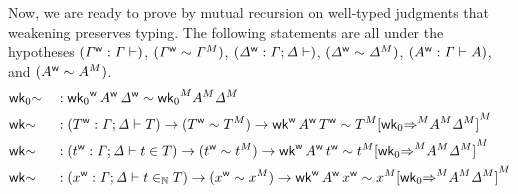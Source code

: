 Now, we are ready to prove by mutual recursion on well-typed judgments that
weakening preserves typing. The following statements are all under the
hypotheses
  $(\wf{\GG} : \GG \vdash)$,
  $(\wf\GG \sim \model{\GG})$,
  $(\wf{\GD} : \GG\merge\GD \vdash)$,
  $(\wf\GD \sim \model{\GD})$,
  $(\wf{A} : \GG \vdash A)$,
  and
  $(\wf{A} \sim \model{A})$.
\begin{alignat*}{5}
  & \wkO{\sim}  &&
   :
  \wf{\wkO}\,\wf{A}\,\wf{\GD}\sim\model{\wkO}\model{A}\model{\GD}
  \\
  & \wk{\sim} && :
  (\wf{T} : \GG\merge\GD \vdash T) \ra
  (\wf{T} \sim \model{T}) \ra
  \wf{\wk}\,\wf{A}\,\wf{T}\sim\model{T}\model{[\model{\wkO{\Rightarrow}}\model{A}\model{\GD}]}
  \\
  & \wk{\sim} && :
  (\wf{t} : \GG\merge\GD \vdash t\in T) \ra
  (\wf{t} \sim \model{t}) \ra
  \wf{\wk}\,\wf{A}\,\wf{t}\sim\model{t}\model{[\model{\wkO{\Rightarrow}}\model{A}\model{\GD}]}
  \\
  & \wk{\sim} && :
  (\wf{x} : \GG\merge\GD \vdash t\invar T) \ra
  (\wf{x} \sim \model{x}) \ra
  \wf{\wk}\,\wf{A}\,\wf{x}\sim\model{x}\model{[\model{\wkO{\Rightarrow}}\model{A}\model{\GD}]}
\end{alignat*}
